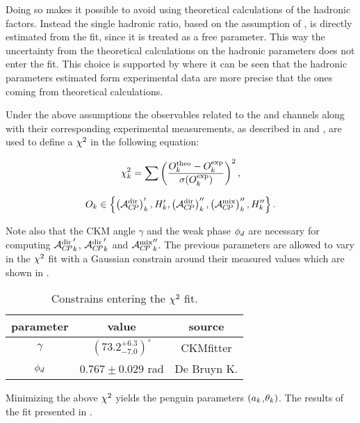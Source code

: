 \noindent Doing so makes it possible to avoid using theoretical calculations of the hadronic factors.
Instead the single hadronic ratio, based on the assumption of , is directly
estimated from the fit, since it is treated as a free parameter. This way the uncertainty from the theoretical
calculations on the hadronic parameters does not enter the fit. This choice is supported by \cite{DeBruyn:2014oga,DeBruyn-thesis}
where it can be seen that the hadronic parameters estimated form experimental data are more precise
that the ones coming from theoretical calculations.

Under the above assumptions the observables related to the \BsJpsiKst and \BdJpsiRho channels along
with their corresponding experimental measurements, as described in  and
, are used to define a $\chi^2$ in the following equation:

\begin{equation}
  \centering
  \chisq_k = \sum \left(\frac{O^{\rm theo}_k - O^{\rm exp}_k} {\sigma(O^{\rm exp}_k)}\right)^2,
  \label{chisq_form}
\end{equation}


\begin{equation}
  \centering
  O_k \in \left\{ \parenthesis{\Acp{\rm dir}}'_k, \Hobs{k}', \parenthesis{\Acp{\rm dir}}''_k, \parenthesis{\Acp{\rm mix}}''_k, \Hobs{k}'' \right\}.
  \label{chisq_form_with}
\end{equation}

\noindent Note also that the CKM angle $\gamma$ and the weak phase $\phi_{d}$ are necessary for computing
${\mathcal{A}_{C\!P}^{\rm dir}}'_k$, ${\mathcal{A}_{C\!P}^{\rm dir}}'_k$ and ${\mathcal{A}_{C\!P}^{\rm mix}}''_k$. The previous parameters are allowed to vary in the
$\chi^2$ fit with a Gaussian constrain around their measured values which are shown in .

\begin{table}[!h]
  \center
  \begin{tabular}{c c c}
    \hline
    parameter & value & source \\
    \hline
    $\gamma$      & $\left(73.2_{-7.0}^{+6.3}\right)^{\circ}$ & CKMfitter \cite{Charles:2015gya} \\
    $\phi_{d}$       & $0.767 \pm 0.029$ rad & De Bruyn K.\cite{DeBruyn-thesis} \\
    \hline
  \end{tabular}
  \caption{\small Constrains entering the $\chi^2$ fit.}
  \label{chi2_fit_constrains}
\end{table}

\noindent Minimizing the above $\chi^2$ yields the penguin parameters $(a_k$,$\theta_k)$.
The results of the fit presented in .
